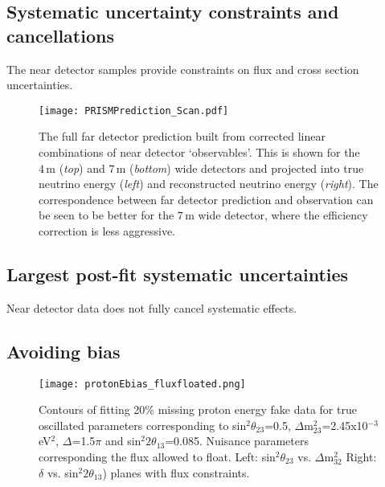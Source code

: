 
\subsection{Systematic uncertainty constraints and cancellations}

The near detector samples provide constraints on flux and cross section uncertainties.



\begin{figure}
  \centering
  \texttt{[image: PRISMPrediction\_Scan.pdf]}
  \caption{The full far detector prediction built from corrected linear combinations of near detector `observables'. This is shown for the $4\,\textrm{m}$ (\emph{top}) and $7\,\textrm{m}$ (\emph{bottom}) wide detectors and projected into true neutrino energy (\emph{left}) and reconstructed neutrino energy (\emph{right}). The correspondence between far detector prediction and observation can be seen to be better for the $7\,\textrm{m}$ wide detector, where the efficiency correction is less aggressive. }
  \label{fig:PRISM_PRISMPrediction}
\end{figure}

\subsection{Largest post-fit systematic uncertainties}

Near detector data does not fully cancel systematic effects.

\subsection{Avoiding bias}

\begin{figure}[h]
\centering
\texttt{[image: protonEbias\_fluxfloated.png]}
\caption{Contours of fitting 20\% missing proton energy fake data for true oscillated parameters corresponding to  sin$^{2}\theta_{23}$=0.5, $\Delta$m$^{2}_{23}$=2.45x10$^{-3}$ eV$^{2}$, $\Delta$=1.5$\pi$ and sin$^{2}2\theta_{13}$=0.085. Nuisance parameters corresponding the flux allowed to float.
Left: sin$^{2}\theta_{23}$ vs. $\Delta$m$^{2}_{32}$ Right: $\delta$ vs. sin$^{2}2\theta_{13}$) planes with flux constraints.} \label{protonFDSbias}
\end{figure}

